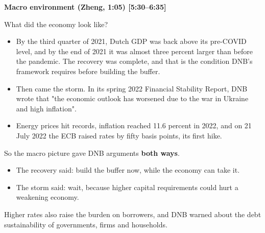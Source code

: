 {\small\textbf{Macro environment (Zheng, 1:05) [5:30–6:35]}}\par\smallskip
What did the economy look like?
\begin{itemize}\setlength\itemsep{0pt}
\item By the third quarter of 2021, Dutch GDP was back above its pre-COVID level, and by the end of 2021 it was almost three percent larger than before the pandemic. The recovery was complete, and that is the condition DNB's framework requires before building the buffer.
\item Then came the storm. In its spring 2022 Financial Stability Report, DNB wrote that "the economic outlook has worsened due to the war in Ukraine and high inflation".
\item Energy prices hit records, inflation reached 11.6 percent in 2022, and on 21 July 2022 the ECB raised rates by fifty basis points, its first hike.
\end{itemize}
\par\smallskip
So the macro picture gave DNB arguments \textbf{both ways}.
\begin{itemize}\setlength\itemsep{0pt}
\item The recovery said: build the buffer now, while the economy can take it.
\item The storm said: wait, because higher capital requirements could hurt a weakening economy.
\end{itemize}
\par\smallskip
Higher rates also raise the burden on borrowers, and DNB warned about the debt sustainability of governments, firms and households.
